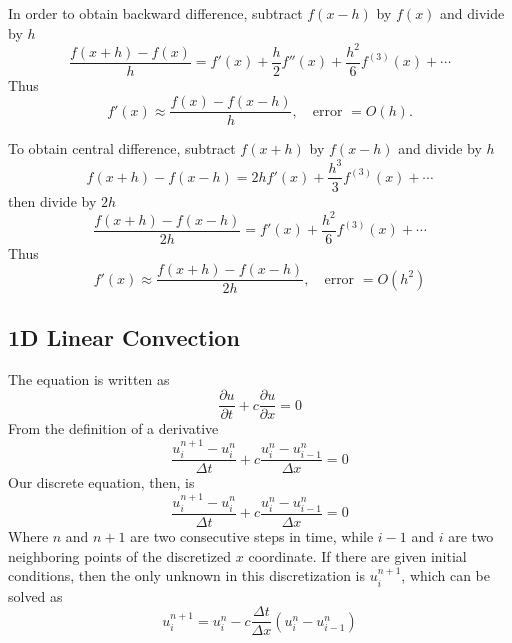 \documentclass[../../../main.tex]{subfiles}
\begin{document}
In order to obtain backward difference, subtract $f(x-h)$ by $f(x)$ and divide by $h$
\begin{equation*}
    \frac{f(x+h) - f(x)}{h} = f'(x) + \frac{h}{2} f''(x) + \frac{h^2}{6} f^{(3)}(x) +\cdots
\end{equation*}
Thus
\begin{equation*}
    f'(x) \approx \frac{f(x) - f(x-h)}{h}, \quad \text{error } = O(h).
\end{equation*}

To obtain central difference, subtract $f(x+h)$ by $f(x-h)$ and divide by $h$
\begin{equation*}
    f(x+h) - f(x-h) = 2h f'(x) + \frac{h^3}{3} f^{(3)}(x) +\cdots
\end{equation*}
then divide by $2h$
\begin{equation*}
    \frac{f(x+h) - f(x-h)}{2h} = f'(x) + \frac{h^2}{6} f^{(3)}(x) +\cdots
\end{equation*}
Thus
\begin{equation*}
    f'(x) \approx \frac{f(x+h) - f(x-h)}{2h}, \quad \text{error } = O(h^2)
\end{equation*}

\subsection{1D Linear Convection}
The equation is written as
\begin{equation*}
    \frac{\partial u}{\partial t} + c \frac{\partial u}{\partial x} = 0
\end{equation*}
From the definition of a derivative
\begin{equation*}
    \frac{u_i^{n+1}-u_i^n}{\Delta t} + c \frac{u_i^n - u_{i-1}^n}{\Delta x} = 0
\end{equation*}
Our discrete equation, then, is
\begin{equation*}
    \frac{u_i^{n+1}-u_i^n}{\Delta t} + c \frac{u_i^n - u_{i-1}^n}{\Delta x} = 0
\end{equation*}
Where $n$ and $n+1$ are two consecutive steps in time, while $i-1$ and $i$ are two neighboring points of the discretized $x$ coordinate.
If there are given initial conditions, then the only unknown in this discretization is $u_i^{n+1}$, which can be solved as
\begin{equation*}
    u_i^{n+1} = u_i^n - c \frac{\Delta t}{\Delta x}(u_i^n-u_{i-1}^n)
\end{equation*}
\end{document}
